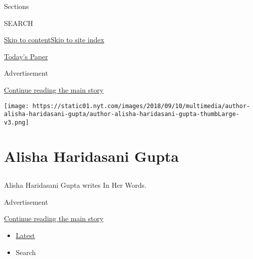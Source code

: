 Sections

SEARCH

\protect\hyperlink{site-content}{Skip to
content}\protect\hyperlink{site-index}{Skip to site index}

\href{https://myaccount.nytimes.com/auth/login?response_type=cookie\&client_id=vi}{}

\href{https://www.nytimes.com/section/todayspaper}{Today's Paper}

Advertisement

\protect\hyperlink{after-top}{Continue reading the main story}

\texttt{[image: https://static01.nyt.com/images/2018/09/10/multimedia/author-alisha-haridasani-gupta/author-alisha-haridasani-gupta-thumbLarge-v3.png]}

\hypertarget{alisha-haridasani-gupta}{%
\section{Alisha Haridasani Gupta}\label{alisha-haridasani-gupta}}

\hypertarget{section}{%
\subsection{}\label{section}}

Alisha Haridasani Gupta writes In Her Words.

Advertisement

\protect\hyperlink{after-mid1}{Continue reading the main story}

\begin{itemize}
\tightlist
\item
  \protect\hyperlink{stream-panel}{Latest}
\item
  Search
\end{itemize}

